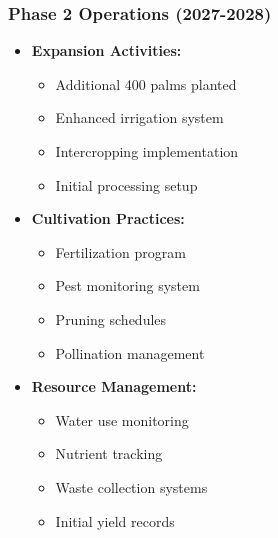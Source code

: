 \subsubsection{Phase 2 Operations (2027-2028)}
\begin{itemize}
    \item \textbf{Expansion Activities:}
    \begin{itemize}
        \item Additional 400 palms planted
        \item Enhanced irrigation system
        \item Intercropping implementation
        \item Initial processing setup
    \end{itemize}
    \item \textbf{Cultivation Practices:}
    \begin{itemize}
        \item Fertilization program
        \item Pest monitoring system
        \item Pruning schedules
        \item Pollination management
    \end{itemize}
    \item \textbf{Resource Management:}
    \begin{itemize}
        \item Water use monitoring
        \item Nutrient tracking
        \item Waste collection systems
        \item Initial yield records
    \end{itemize}
\end{itemize}


